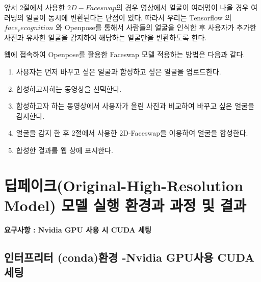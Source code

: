 \documentclass[chapter,oneside]{oblivoir}
\begin{document}
앞서 2절에서 사용한 $2D-Faceswap$의 경우 영상에서 얼굴이 여러명이 나올 경우 여러명의 얼굴이 동시에 변환된다는 단점이 있다. 따라서 우리는 Tensorflow 의 $face_recognition$ 와 Openpose를 통해서 사람들의 얼굴을 인식한 후 사용자가 추가한 사진과 유사한 얼굴을 감지하여 해당하는 얼굴만을 변환하도록 한다.

웹에 접속하여 Openpose를 활용한 Faceswap 모델 적용하는 방법은 다음과 같다.

\begin{enumerate}
    \item 사용자는 먼저 바꾸고 싶은 얼굴과 합성하고 싶은 얼굴을 업로드한다.
    \item 합성하고자하는 동영상을 선택한다.
    \item 합성하고자 하는 동영상에서 사용자가 올린 사진과 비교하여 바꾸고 싶은 얼굴을 감지한다.
    \item 얼굴을 감지 한 후 2절에서 사용한 2D-Faceswap을 이용하여 얼굴을 합성한다.
    \item 합성한 결과를 웹 상에 표시한다.
\end{enumerate}

\section{딥페이크(Original-High-Resolution Model) 모델 실행 환경과 과정 및 결과}

\textbf{요구사항 : Nvidia GPU 사용 시 CUDA 세팅}


\subsection{인터프리터 (conda)환경 -Nvidia GPU사용 CUDA 세팅}
\end{document}
